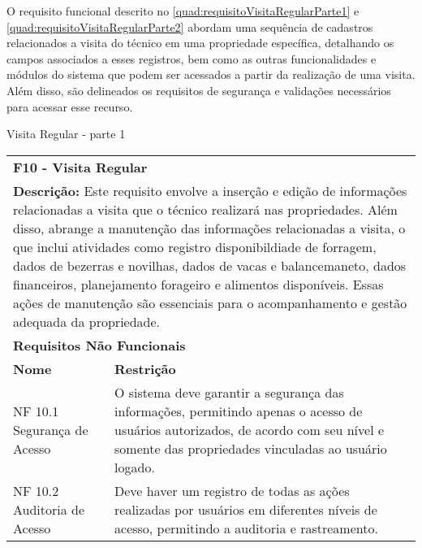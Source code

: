 \clearpage

O requisito funcional descrito no \autoref{quad:requisitoVisitaRegularParte1} e \autoref{quad:requisitoVisitaRegularParte2} abordam uma sequência de cadastros relacionados a visita do técnico em uma propriedade específica, detalhando os campos associados a esses registros, bem como as outras funcionalidades e módulos do sistema que podem ser acessados a partir da realização de uma visita. Além disso, são delineados os requisitos de segurança e validações necessários para acessar esse recurso.

\begin{tabframed}[htb]
  \caption{Visita Regular - parte 1}
  \label{quad:requisitoVisitaRegularParte1}
  \renewcommand{\arraystretch}{1.5}
  \begin{tabular}{|l|l|}
    \cline{1-2}
    \multicolumn{2}{|l|}{\textbf{F10 - Visita Regular}}
    \\ \cline{1-2}

    \multicolumn{2}{|p{15cm}|}{
    \raggedright \textbf{Descrição:} Este requisito envolve a inserção e edição de informações relacionadas a visita que o técnico realizará nas propriedades.
    Além disso, abrange a manutenção das informações relacionadas a  visita, o que inclui atividades como registro disponibildiade de forragem, dados de bezerras e novilhas, dados de vacas e balancemaneto, dados financeiros, planejamento forageiro e alimentos disponíveis. Essas ações de manutenção são essenciais para o acompanhamento e gestão adequada da propriedade.
    }
    \\ \cline{1-2}

    \multicolumn{2}{|l|}{\textbf{Requisitos Não Funcionais}}
    \\ \cline{1-2}

    \textbf{Nome}                                                                 &
    \textbf{Restrição}
    \\ \cline{1-2}

    \multicolumn{1}{|p{3cm}|}{\raggedright NF 10.1 Segurança de Acesso}           &
    \multicolumn{1}{|p{12cm}|}{\raggedright O sistema deve garantir a segurança das informações, permitindo apenas o acesso de usuários autorizados, de acordo com seu nível e somente das propriedades vinculadas ao usuário logado.}
    \\ \cline{1-2}

    \multicolumn{1}{|p{3cm}|}{\raggedright NF 10.2 Auditoria de Acesso}           &
    \multicolumn{1}{|p{12cm}|}{\raggedright Deve haver um registro de todas as ações realizadas por usuários em diferentes níveis de acesso, permitindo a auditoria e rastreamento.}
    \\ \cline{1-2}


\end{tabular}
\end{tabframed}
